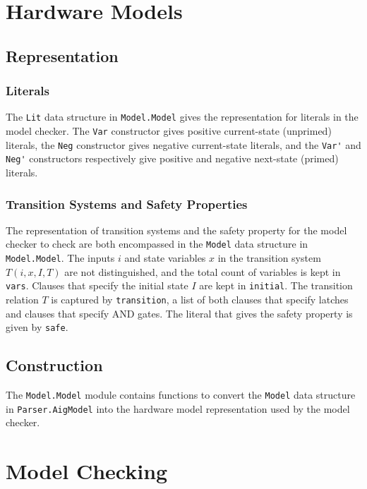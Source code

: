 \documentclass[12pt,a4paper,twoside,openright]{report}
\begin{document}
\section{Hardware Models}
\subsection{Representation}
\subsubsection{Literals}
The \verb,Lit, data structure in \verb,Model.Model, gives the representation for literals in
the model checker.
The \verb,Var, constructor gives positive current-state (unprimed) literals, the \verb,Neg,
constructor gives negative current-state literals, and the \verb,Var', and \verb,Neg', constructors
respectively give positive and negative next-state (primed) literals.

\subsubsection{Transition Systems and Safety Properties}
The representation of transition systems and the safety property for the model checker to check
are both encompassed in the \verb,Model, data structure in \verb,Model.Model,.
The inputs $i$ and state variables $x$ in the transition system $T(i,x,I,T)$
are not distinguished, and the total count of variables is kept in \verb,vars,.
Clauses that specify the initial state $I$ are kept in \verb,initial,.
The transition relation $T$ is captured by \verb,transition,, a list of both clauses that specify
latches and clauses that specify AND gates.
The literal that gives the safety property is given by \verb,safe,.

\subsection{Construction}

The \verb,Model.Model, module contains functions to convert the \verb,Model, data
structure in \verb,Parser.AigModel, into the hardware model representation used by
the model checker.

\section{Model Checking}
\end{document}
